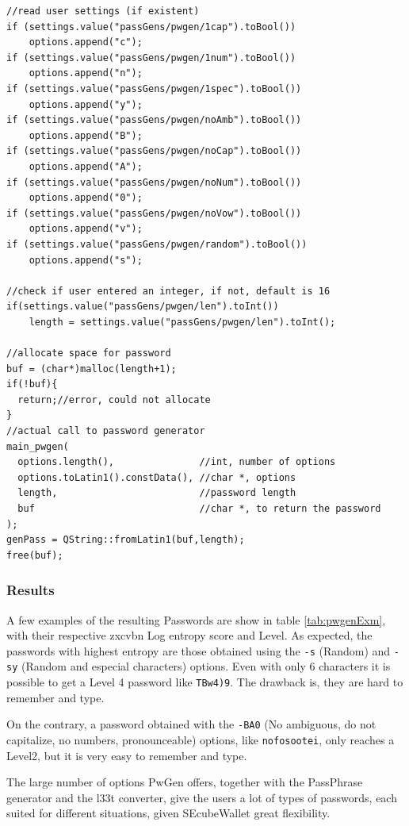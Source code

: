 \begin{lstlisting}[style=customc, float=htb, caption={PwGen call inside AddEntry}, label = {lis:pwgen}]
//read user settings (if existent)
if (settings.value("passGens/pwgen/1cap").toBool())
    options.append("c");
if (settings.value("passGens/pwgen/1num").toBool())
    options.append("n");
if (settings.value("passGens/pwgen/1spec").toBool())
    options.append("y");
if (settings.value("passGens/pwgen/noAmb").toBool())
    options.append("B");
if (settings.value("passGens/pwgen/noCap").toBool())
    options.append("A");
if (settings.value("passGens/pwgen/noNum").toBool())
    options.append("0");
if (settings.value("passGens/pwgen/noVow").toBool())
    options.append("v");
if (settings.value("passGens/pwgen/random").toBool())
    options.append("s");

//check if user entered an integer, if not, default is 16
if(settings.value("passGens/pwgen/len").toInt())
    length = settings.value("passGens/pwgen/len").toInt();

//allocate space for password
buf = (char*)malloc(length+1);
if(!buf){
  return;//error, could not allocate
}
//actual call to password generator
main_pwgen(
  options.length(),               //int, number of options 
  options.toLatin1().constData(), //char *, options 
  length,                         //password length 
  buf                             //char *, to return the password           
);
genPass = QString::fromLatin1(buf,length);
free(buf);
\end{lstlisting}

\subsubsection*{Results}

A few examples of the resulting Passwords are show in table \ref{tab:pwgenExm}, with their respective zxcvbn Log entropy score and Level. As expected, the passwords with highest entropy are those obtained using the \texttt{-s} (Random) and \texttt{-sy} (Random and especial characters) options. Even with only 6 characters it is possible to get a Level 4 password like \texttt{TBw4)9}. The drawback is, they are hard to remember and type. 

On the contrary, a password obtained with the \texttt{-BA0} (No ambiguous, do not capitalize, no numbers, pronounceable) options, like \texttt{nofosootei}, only reaches a Level2, but it is very easy to remember and type.

The large number of options PwGen offers, together with the PassPhrase generator and the l33t converter, give the users a lot of types of passwords, each suited for different situations, given SEcubeWallet great flexibility.

